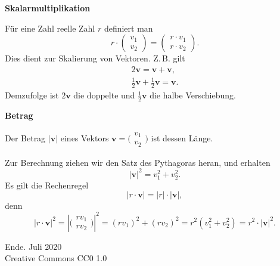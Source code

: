 \documentclass[9pt]{beamer}
\newcommand{\modest}[1]{{\small\color{gray}#1}}
\newcommand{\bv}[1]{\mathbf{#1}}
\newcommand{\strong}[1]{\textsf{\textbf{#1}}}
\newcommand{\icol}[1]{
  \big(\!\begin{smallmatrix}#1\end{smallmatrix}\!\big)%
}
\newcommand{\parspace}{\vspace{0.8em}}
\begin{document}
\begin{frame}
\begin{center}
\strong{Skalarmultiplikation}
\end{center}
\end{frame}

\begin{frame}
Für eine Zahl reelle Zahl $r$ definiert man
\[r\cdot\begin{pmatrix}v_1\\ v_2\end{pmatrix}
= \begin{pmatrix}r\cdot v_1\\ r\cdot v_2\end{pmatrix}.\]\pause
Dies dient zur Skalierung von Vektoren. Z.\,B. gilt
\begin{gather*}
2\bv v = \bv v + \bv v,\\
\tfrac{1}{2}\bv v + \tfrac{1}{2}\bv v = \bv v.
\end{gather*}
Demzufolge ist $2\bv v$ die doppelte und $\tfrac{1}{2}\bv v$ die halbe
Verschiebung.
\end{frame}


\begin{frame}
\begin{center}
\strong{Betrag}
\end{center}
\end{frame}

\begin{frame}
Der Betrag $|\bv v|$ eines Vektors $\bv v = \icol{v_1\\ v_2}$ ist dessen Länge.\pause

\parspace
Zur Berechnung ziehen wir den Satz des Pythagoras heran, und erhalten
\[|\bv v|^2 = v_1^2+v_2^2.\]\pause
Es gilt die Rechenregel
\[|r\cdot\bv v| = |r|\cdot|\bv v|,\]
denn
\[|r\cdot\bv v|^2 = |\icol{rv_1\\ rv_2}|^2
= (rv_1)^2+(rv_2)^2 = r^2(v_1^2+v_2^2) = r^2\cdot |\bv v|^2.\]
\end{frame}

\begin{frame}
Ende.
\vfill\hfill\modest{Juli 2020}\\
\hfill\modest{Creative Commons CC0 1.0}
\end{frame}
\end{document}
